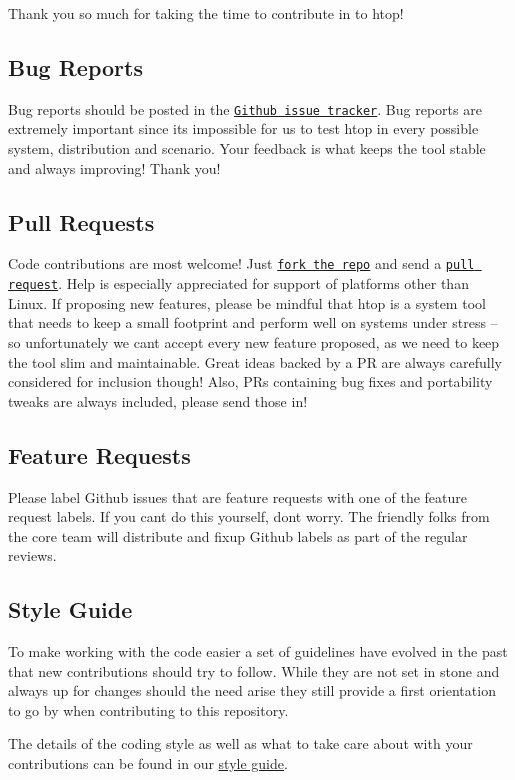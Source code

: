 Thank you so much for taking the time to contribute in to htop!

\subsection*{Bug Reports }

Bug reports should be posted in the \href{https://github.com/htop-dev/htop/issues}{\tt Github issue tracker}. Bug reports are extremely important since it\textquotesingle{}s impossible for us to test htop in every possible system, distribution and scenario. Your feedback is what keeps the tool stable and always improving! Thank you!

\subsection*{Pull Requests }

Code contributions are most welcome! Just \href{https://github.com/htop-dev/htop}{\tt fork the repo} and send a \href{https://github.com/htop-dev/htop/pulls}{\tt pull request}. Help is especially appreciated for support of platforms other than Linux. If proposing new features, please be mindful that htop is a system tool that needs to keep a small footprint and perform well on systems under stress -- so unfortunately we can\textquotesingle{}t accept every new feature proposed, as we need to keep the tool slim and maintainable. Great ideas backed by a PR are always carefully considered for inclusion though! Also, P\+Rs containing bug fixes and portability tweaks are always included, please send those in!

\subsection*{Feature Requests }

Please label Github issues that are feature requests with one of the {\ttfamily feature request} labels. If you can\textquotesingle{}t do this yourself, don\textquotesingle{}t worry. The friendly folks from the core team will distribute and fixup Github labels as part of the regular reviews.

\subsection*{Style Guide }

To make working with the code easier a set of guidelines have evolved in the past that new contributions should try to follow. While they are not set in stone and always up for changes should the need arise they still provide a first orientation to go by when contributing to this repository.

The details of the coding style as well as what to take care about with your contributions can be found in our \hyperlink{styleguide_8md}{style guide}. 